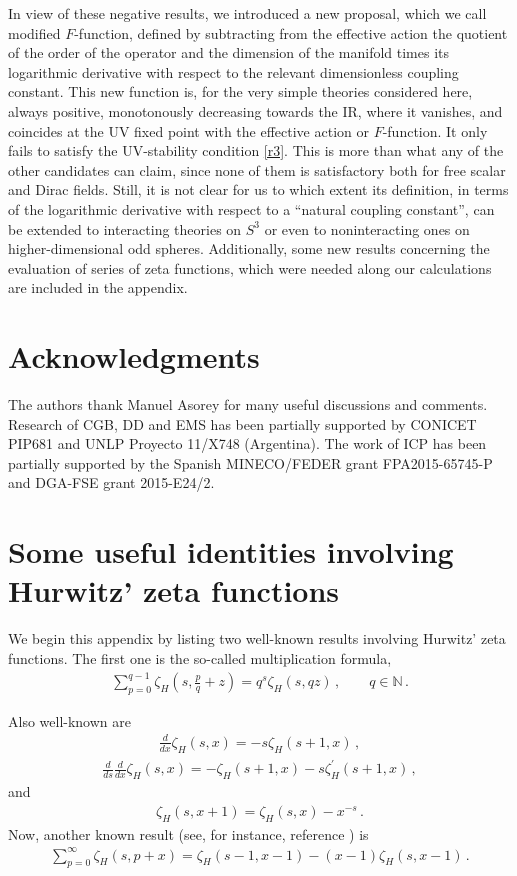 \documentclass[12pt,a4paper]{article}
\newcommand{\beq}{\begin{eqnarray}}
\newcommand{\eeq}{\end{eqnarray}}
\numberwithin{equation}{section}
\begin{document}
In view of these negative results, we introduced a new proposal, which we call modified $F$-function, defined by subtracting from the effective action the quotient of the order of the operator and the dimension of the manifold times its logarithmic derivative with respect to the relevant dimensionless coupling constant. This new function is, for the very simple theories considered here, always positive, monotonously decreasing towards the IR, where it vanishes, and coincides at the UV fixed point with the effective action or $F$-function. It only fails to satisfy the UV-stability condition \ref{r3}. This is more than what any of the other candidates can claim, since none of them is satisfactory both for free scalar and Dirac fields. Still, it is not clear for us to which extent its definition, in terms of the logarithmic derivative with respect to a ``natural coupling constant'', can be extended to interacting theories on $S^3$ or even to noninteracting ones on higher-dimensional odd spheres. Additionally, some new results concerning the evaluation of series of zeta functions, which were needed along our calculations are included in the appendix.

\section*{Acknowledgments}
{The authors thank Manuel Asorey for many useful discussions and comments. Research of CGB, DD and EMS has been partially supported by CONICET PIP681 and UNLP Proyecto 11/X748 (Argentina).
The work of ICP has been partially supported by the Spanish MINECO/FEDER grant FPA2015-65745-P and DGA-FSE grant 2015-E24/2.}



\appendix
\section{Some useful identities involving Hurwitz' zeta functions}\label{ap2}

We begin this appendix by listing two well-known results involving Hurwitz' zeta functions. The first one is the so-called multiplication formula,
\beq
\sum_{p=0}^{q-1} \zeta_H (s, \frac pq +z) = q^s \zeta_H (s, qz)\,, \qquad q \in \mathbb{N} \,.\label{a21}
\eeq

Also well-known are
\beq \frac{d}{dx} \zeta_H (s,x) = -s \zeta_H (s+1,x)\,,
\label{a22}
\eeq
\beq \frac{d}{ds}\frac{d}{dx} \zeta_H (s,x) = -\zeta_H (s+1,x) - s \zeta^{\prime}_H (s+1,x)\,,
\label{a23}
\eeq
and
\beq \zeta_H (s,x+1) =  \zeta_H (s,x) - x^{-s} \,.
\label{a24}
\eeq
Now, another known result (see, for instance, reference \cite{sri}) is
\beq
\sum_{p=0}^{\infty}  \zeta_H (s,p+x)= \zeta_H (s-1,x-1) - (x-1) \zeta_H (s, x-1)\,. \label{a25}
\eeq
\end{document}
